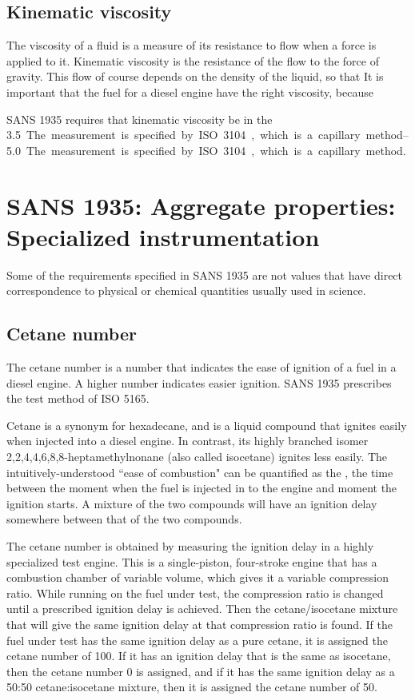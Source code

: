\subsection{Kinematic viscosity}

The viscosity of a fluid is a measure of its resistance to flow when a force is
applied to it. Kinematic viscosity is the resistance of the flow to the force of
gravity. This flow of course depends on the density of the liquid, so that It is
important that the fuel for a diesel engine have the right viscosity, because

SANS 1935 requires that kinematic viscosity be in the \SIrange{3.5}{5.0}. The
measurement is specified by ISO 3104, which is a capillary method.

\section{SANS 1935: Aggregate properties: Specialized instrumentation}

Some of the requirements specified in SANS 1935 are not values that have direct
correspondence to physical or chemical quantities usually used in science. 

\subsection{Cetane number}

The cetane number is a number that indicates the ease of ignition of a fuel in a
diesel engine. A higher number indicates easier ignition. SANS 1935 prescribes
the test method of ISO 5165.

Cetane is a synonym for hexadecane, and is a liquid compound that ignites easily
when injected into a diesel engine. In contrast, its highly branched isomer
2,2,4,4,6,8,8-heptamethylnonane (also called isocetane) ignites less easily. The
intuitively-understood ``ease of combustion" can be quantified as the
, the time between the moment when the fuel is injected
in to the engine and moment the ignition starts. A mixture of the two compounds
will have an ignition delay somewhere between that of the two compounds.

The cetane number is obtained by measuring the ignition delay in a  highly
specialized test engine. This is a single-piston, four-stroke engine that has a
combustion chamber of variable volume, which gives it a variable compression
ratio. While running on the fuel under test, the compression ratio is changed
until a prescribed ignition delay is achieved. Then the cetane/isocetane mixture
that will give the same ignition delay at that compression ratio is found. If
the fuel under test has the same ignition delay as a pure cetane, it is assigned
the cetane number of 100. If it has an ignition delay that is the same as
isocetane, then the cetane number 0 is assigned, and if it has the same ignition
delay as a 50:50 cetane:isocetane mixture, then it is assigned the cetane number
of 50.

